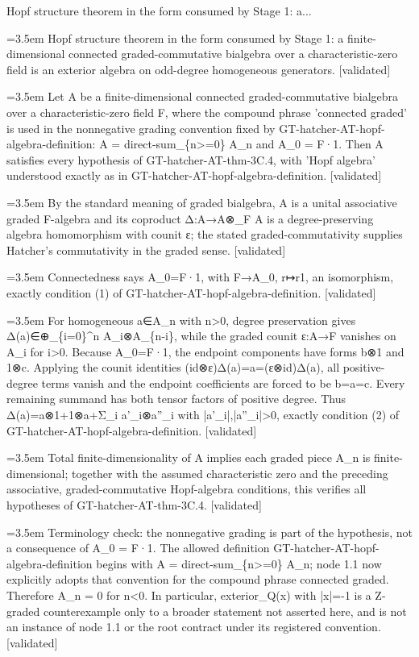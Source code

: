 \documentclass{article}
\newcommand{\step}[1]{\par\noindent\hangindent=3.5em\hangafter=1%
  \makebox[3.5em][l]{\textbf{#1.}}}
\newcommand{\steptag}[1]{\hfill{\small\textsf{[#1]}}}
\begin{document}
\begin{proofbox}{Hopf structure theorem in the form consumed by Stage 1: a...}
\step{1} Hopf structure theorem in the form consumed by Stage 1: a finite-dimensional connected graded-commutative bialgebra over a characteristic-zero field is an exterior algebra on odd-degree homogeneous generators. \steptag{validated} \\[6pt]
\step{1.1} Let A be a finite-dimensional connected graded-commutative bialgebra over a characteristic-zero field F, where the compound phrase 'connected graded' is used in the nonnegative grading convention fixed by GT-hatcher-AT-hopf-algebra-definition: A = direct-sum\_\{n>=0\} A\_n and A\_0 = F·1. Then A satisfies every hypothesis of GT-hatcher-AT-thm-3C.4, with 'Hopf algebra' understood exactly as in GT-hatcher-AT-hopf-algebra-definition. \steptag{validated} \\[6pt]
\step{1.1.1} By the standard meaning of graded bialgebra, A is a unital associative graded F-algebra and its coproduct Δ:A→A⊗\_F A is a degree-preserving algebra homomorphism with counit ε; the stated graded-commutativity supplies Hatcher's commutativity in the graded sense. \steptag{validated} \\[4pt]
\step{1.1.2} Connectedness says A\_0=F·1, with F→A\_0, r↦r1, an isomorphism, exactly condition (1) of GT-hatcher-AT-hopf-algebra-definition. \steptag{validated} \\[4pt]
\step{1.1.3} For homogeneous a∈A\_n with n>0, degree preservation gives Δ(a)∈⊕\_\{i=0\}\textasciicircum{}n A\_i⊗A\_\{n-i\}, while the graded counit ε:A→F vanishes on A\_i for i>0. Because A\_0=F·1, the endpoint components have forms b⊗1 and 1⊗c. Applying the counit identities (id⊗ε)Δ(a)=a=(ε⊗id)Δ(a), all positive-degree terms vanish and the endpoint coefficients are forced to be b=a=c. Every remaining summand has both tensor factors of positive degree. Thus Δ(a)=a⊗1+1⊗a+Σ\_i a'\_i⊗a''\_i with |a'\_i|,|a''\_i|>0, exactly condition (2) of GT-hatcher-AT-hopf-algebra-definition. \steptag{validated} \\[4pt]
\step{1.1.4} Total finite-dimensionality of A implies each graded piece A\_n is finite-dimensional; together with the assumed characteristic zero and the preceding associative, graded-commutative Hopf-algebra conditions, this verifies all hypotheses of GT-hatcher-AT-thm-3C.4. \steptag{validated} \\[4pt]
\step{1.1.5} Terminology check: the nonnegative grading is part of the hypothesis, not a consequence of A\_0 = F·1. The allowed definition GT-hatcher-AT-hopf-algebra-definition begins with A = direct-sum\_\{n>=0\} A\_n; node 1.1 now explicitly adopts that convention for the compound phrase connected graded. Therefore A\_n = 0 for n<0. In particular, exterior\_Q(x) with |x|=-1 is a Z-graded counterexample only to a broader statement not asserted here, and is not an instance of node 1.1 or the root contract under its registered convention. \steptag{validated} \\[4pt]

\end{proofbox}
\end{document}
